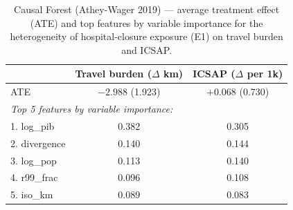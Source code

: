 \begin{table}[h!]
\centering
\caption{Causal Forest (Athey-Wager 2019) — average treatment effect (ATE) and top features by variable importance for the heterogeneity of hospital-closure exposure (E1) on travel burden and ICSAP.}
\label{tab:cf}
\small
\begin{tabular}{lcc}
\toprule
 & Travel burden ($\Delta$ km) & ICSAP ($\Delta$ per 1k) \\
\midrule
ATE & $-2.988$ (1.923) & $+0.068$ (0.730) \\
\midrule
\multicolumn{3}{l}{\textit{Top 5 features by variable importance:}} \\
1. log\_pib & 0.382 & 0.305 \\
2. divergence & 0.140 & 0.144 \\
3. log\_pop & 0.113 & 0.140 \\
4. r99\_frac & 0.096 & 0.108 \\
5. iso\_km & 0.089 & 0.083 \\
\bottomrule
\end{tabular}
\end{table}
